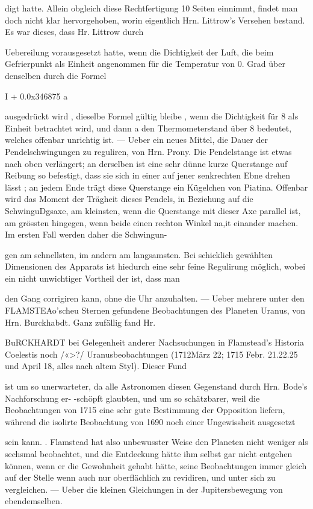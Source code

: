 \documentclass[10pt,a4paper]{article}
\begin{document}
digt hatte. Allein obgleich diese Rechtfertigung 10 Seiten einnimmt, findet man doch nicht klar hervorgehoben, worin eigentlich Hrn. Littrow's Versehen bestand. Es war dieses, dass Hr. Littrow durch

Uebereilung vorausgesetzt hatte, wenn die Dichtigkeit der Luft, die beim Gefrierpunkt als Einheit angenommen für die Temperatur von 0. Grad über denselben durch die Formel

I + 0.0x346875 a

ausgedrückt wird , dieselbe Formel gültig bleibe , wenn die Dichtigkeit für 8\textdegree{} als Einheit betrachtet wird, und dann a den Thermometerstand über 8\textdegree{} bedeutet, welches offenbar unrichtig ist. — Ueber ein neues Mittel, die Dauer der Pendelschwingungen zu reguliren, von Hrn. Prony. Die Pendelstange ist etwas nach oben verlängert; an derselben ist eine sehr dünne kurze Querstange auf Reibung so befestigt, dass sie sich in einer auf jener senkrechten Ebne drehen lässt ; an jedem Ende trägt diese Querstange ein Kügelchen von Piatina. Offenbar wird das Moment der Trägheit dieses Pendels, in Beziehung auf die SchwinguDgsaxe, am kleinsten, wenn die Querstange mit dieser Axe parallel ist, am grössten hingegen, wenn beide einen rechton Winkel na,it einander machen. Im ersten Fall werden daher die Schwingun-

gen am schnellsten, im andern am langsamsten. Bei schicklich gewählten Dimensionen des Apparats ist hiedurch eine sehr feine Regulirung möglich, wobei ein nicht unwichtiger Vortheil der ist, dass man

den Gang corrigiren kann, ohne die Uhr anzuhalten. — Ueber mehrere unter den FLAMSTEAo'scheu Sternen gefundene Beobachtungen des Planeten Uranus, von Hrn. Burckhabdt. Ganz zufällig fand Hr.

BuRCKHARDT bei Gelegenheit anderer Nachsuchungen in Flamstead's Historia Coelestis noch /«>?/ Uranusbeobachtungen (1712März 22; 1715 Febr. 21.22.25 und April 18, alles nach altem Styl). Dieser Fund

ist um so unerwarteter, da alle Astronomen diesen Gegenstand durch Hrn. Bode's Nachforschung er- -schöpft glaubten, und um so schätzbarer, weil die Beobachtungen von 1715 eine sehr gute Bestimmung der Opposition liefern, während die isolirte Beobachtung von 1690 noch einer Ungewissheit ausgesetzt

sein kann. . Flamstead hat also unbewusster Weise den Planeten nicht weniger als sechsmal beobachtet, und die Entdeckung hätte ihm selbst gar nicht entgehen können, wenn er die Gewohnheit gehabt hätte, seine Beobachtungen immer gleich auf der Stelle wenn auch nur oberflächlich zu revidiren, und unter sich zu vergleichen. — Ueber die kleinen Gleichungen in der Jupitersbewegung von ebendemselben.
\end{document}
